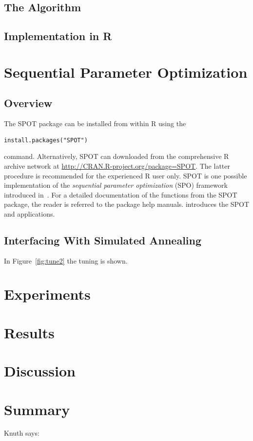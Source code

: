 \documentclass[runningheads]{llncs}
\begin{document}
\subsection{The Algorithm}

\subsection{Implementation in R}

\section{Sequential Parameter Optimization}
\subsection{Overview}
 The SPOT package can be installed from within R using the 
\begin{verbatim}
install.packages("SPOT")
\end{verbatim}
command. Alternatively, SPOT can 
downloaded from the
comprehensive R  archive network at \url{http://CRAN.R-project.org/package=SPOT}.
The latter procedure is recommended for the experienced R user only. 
SPOT is one possible implementation of the \emph{sequential parameter optimization}\/
(SPO) framework introduced in~\cite{Bart06a}.
For a detailed documentation of the functions from the SPOT package, the
reader is referred to the package help manuals.
\cite{Bart12i} introduces the SPOT and applications.
\subsection{Interfacing With Simulated Annealing}
In Figure~\ref{fig:tune2} the tuning is shown.



\section{Experiments}

\section{Results}

\section{Discussion}

\section{Summary}
Knuth says:
\cite{knuth2005art}



\end{document}
